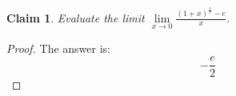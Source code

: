 \documentclass{article}
\newtheorem{theorem}{Claim}
\begin{document}
\begin{theorem}
Evaluate the limit $\lim\limits_{x\to 0}\frac{(1+x)^{\frac{1}{x}}-e}{x}$.
\end{theorem}

\begin{proof}
The answer is:
\[
-\frac{ e}{2}
\]
\end{proof}
\end{document}
